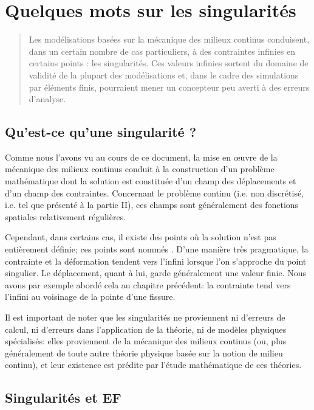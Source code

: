 \chapter{Quelques mots sur les singularités}\label{Ch-Singul}
\begin{abstract}
Les modélisations basées sur la mécanique des milieux continus conduisent, dans un certain
nombre de cas particuliers, à des contraintes \og infinies\fg{} en certains points : les singularités. 
Ces valeurs infinies sortent du domaine de validité de la plupart des modélisations et, dans le cadre
des simulations par éléments finis, pourraient mener un concepteur peu averti  à des erreurs d'analyse.
\end{abstract}


\medskip
\section{Qu'est-ce qu'une singularité ?}

Comme nous l'avons vu au cours de ce document, la mise en œuvre de la mécanique des milieux 
continus conduit à la construction d'un problème mathématique dont la solution est constituée 
d'un champ des déplacements et d'un champ des contraintes. 
Concernant le problème continu (i.e. non discrétisé, i.e. tel que présenté à la partie II), 
ces champs sont généralement des fonctions spatiales relativement régulières.

\medskip
Cependant, dans certains cas, il existe des points où la solution n'est pas entièrement définie; 
ces points sont nommés . 
D'une manière très pragmatique, la contrainte et la déformation tendent vers
l'infini lorsque l'on s'approche du point singulier. Le déplacement, quant à lui, garde
généralement une valeur finie. 
Nous avons par exemple abordé cela au chapitre précédent: la contrainte tend vers l'infini au 
voisinage de la pointe d'une fissure.

\medskip
Il est important de noter que les singularités ne proviennent ni d'erreurs de calcul, ni d'erreurs
dans l'application de la théorie, ni de modèles physiques spécialisés: elles proviennent de la
mécanique des milieux continus (ou, plus généralement de toute autre théorie physique basée sur 
la notion de milieu continu), et leur existence est prédite par l'étude mathématique de ces
théories.

\medskip
\section{Singularités et EF}

